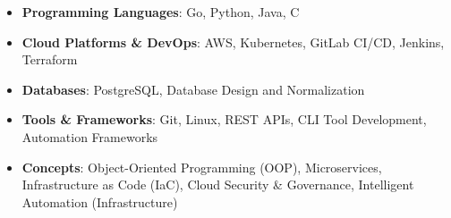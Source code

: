 \begin{itemize}
    \item \textbf{Programming Languages}: Go, Python, Java, C
    \item \textbf{Cloud Platforms \& DevOps}: AWS, Kubernetes, GitLab CI/CD, Jenkins, Terraform
    \item \textbf{Databases}: PostgreSQL, Database Design and Normalization
    \item \textbf{Tools \& Frameworks}: Git, Linux, REST APIs, CLI Tool \mbox{Development}, Automation Frameworks
    \item \textbf{Concepts}: Object-Oriented Programming (OOP), Microservices, Infrastructure as Code (IaC), Cloud Security \& Governance, Intelligent Automation (Infrastructure)
\end{itemize}
